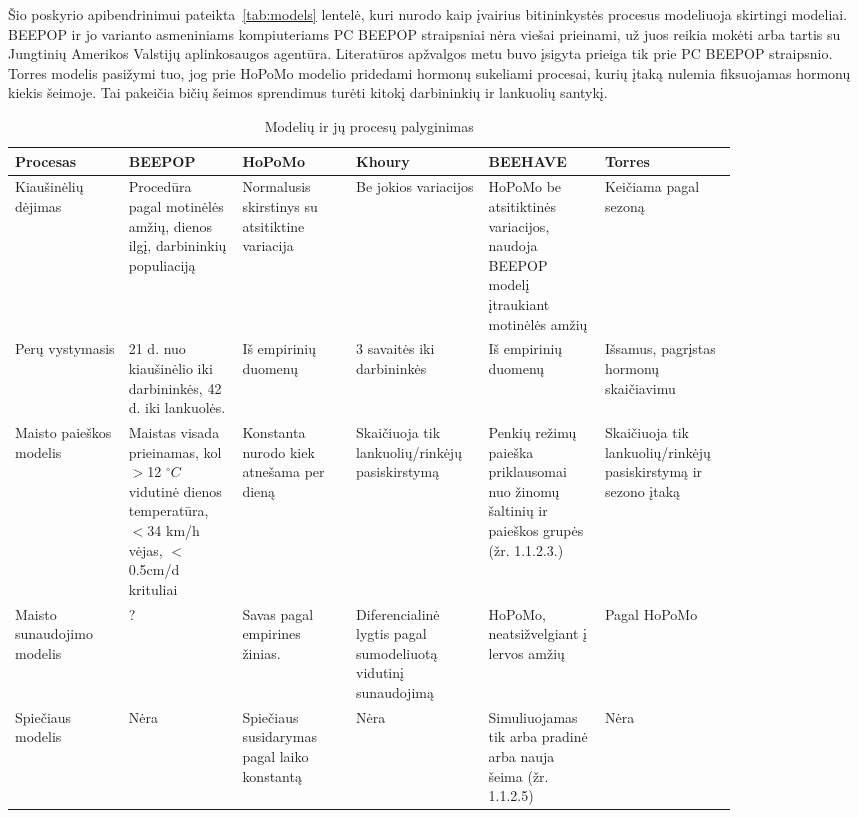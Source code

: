 \documentclass{VUMIFKompMagistrinis}
\begin{document}
Šio poskyrio apibendrinimui pateikta~\ref{tab:models} lentelė, kuri nurodo kaip įvairius bitininkystės procesus modeliuoja skirtingi modeliai. BEEPOP ir jo varianto asmeniniams kompiuteriams PC BEEPOP \cite{BDO91} straipsniai nėra viešai prieinami, už juos reikia mokėti arba tartis su Jungtinių Amerikos Valstijų aplinkosaugos agentūra. Literatūros apžvalgos metu buvo įsigyta prieiga tik prie PC BEEPOP straipsnio.
Torres \cite{TRR15} modelis pasižymi tuo, jog prie HoPoMo modelio pridedami hormonų sukeliami procesai, kurių įtaką nulemia fiksuojamas hormonų kiekis šeimoje. Tai pakeičia bičių šeimos sprendimus turėti kitokį darbininkių ir lankuolių santykį.



\begin{table} [H]
\small
\centering
\caption{Modelių ir jų procesų palyginimas}
\begin{tabular}{p{0.14\linewidth}|p{0.14\linewidth}|p{0.14\linewidth}|p{0.14\linewidth}|p{0.14\linewidth}|p{0.14\linewidth}}
Procesas & BEEPOP & HoPoMo & Khoury & BEEHAVE & Torres \\
\hline
Kiau\-ši\-nė\-lių dė\-ji\-mas & Procedūra pagal motinėlės amžių, dienos ilgį, darbininkių populiaciją & Normalusis skirstinys su at\-si\-tik\-ti\-ne variacija & Be jokios variacijos & HoPoMo be at\-si\-tik\-ti\-nės variacijos, naudoja BEEPOP modelį įtraukiant motinėlės amžių & Keičiama pagal sezoną \\
\hline
Perų vys\-ty\-ma\-sis & 21 d. nuo kiau\-ši\-nė\-lio iki darbininkės, 42 d. iki lankuolės. & Iš empirinių duomenų \cite{FuS68, FuO77} & 3 savaitės iki darbininkės & Iš empirinių duomenų \cite{FuS68, FuO77}& Išsamus, pagrįstas hormonų skaičiavimu \\
 \hline
Maisto paieškos modelis & Maistas visada prieinamas, kol $>$12 $^\circ C$  vidutinė dienos tem\-pe\-ra\-tū\-ra, $<$34 km/h vėjas, $<$0.5cm/d krituliai & Konstanta nurodo kiek atnešama per dieną & Skaičiuoja tik lankuolių/rinkėjų pasiskirstymą & Penkių režimų paieška priklausomai nuo žinomų šaltinių ir paieškos grupės (žr. 1.1.2.3.) & Skaičiuoja tik lankuolių/rinkėjų pasiskirstymą ir sezono įtaką \\
 \hline
Maisto su\-nau\-do\-ji\-mo mo\-de\-lis & ? & Savas pagal em\-pi\-ri\-nes ži\-nias. & Di\-fe\-ren\-cia\-li\-nė lygtis pa\-gal su\-mo\-de\-liuo\-tą vi\-du\-ti\-nį su\-nau\-do\-ji\-mą & HoPoMo, neatsižvelgiant į lervos amžių & Pagal HoPoMo \\
\hline
Spiečiaus modelis & Nėra & Spiečiaus susidarymas pagal laiko konstantą & Nėra & Simuliuojamas tik arba pradinė arba nauja šeima (žr. 1.1.2.5) & Nėra \\

\end{tabular}
\end{table}
\end{document}
